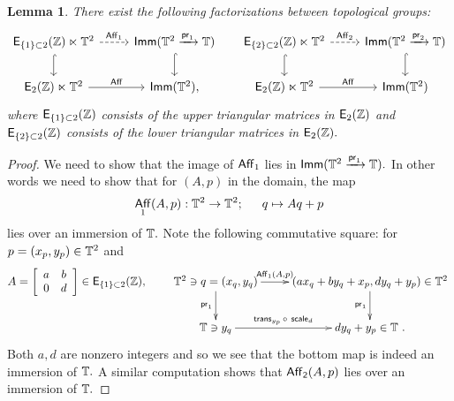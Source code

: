 \documentclass{amsart}
\newtheorem{lemma}[theorem]{Lemma}
\theoremstyle{definition}
\theoremstyle{remark}
\DeclareMathOperator{\pr}{\mathsf{pr}}
\newcommand{\xra}{\xrightarrow}
\DeclareMathOperator{\trans}{\sf trans}
\DeclareMathOperator{\Imm}{\sf Imm}
\DeclareMathOperator{\Aff}{\sf Aff}
\begin{document}
\begin{lemma} %
There exist the following factorizations between topological groups: %
\[
\begin{tikzcd}
{\sf E}_{\{1\} \subset 2}(\ZZ) \ltimes \TT^{2} \arrow[dashed, r, "{\sf Aff}_{1}"] \arrow[hookrightarrow]{d}& \Imm(\TT^2 \xra{\pr_1} \TT)  \arrow[hookrightarrow]{d} \\
{\sf E}_{2}(\ZZ) \ltimes \TT^{2} \arrow[r, "{\sf Aff}"] & \Imm(\TT^{2}),
\end{tikzcd}
\hspace{15pt}
\begin{tikzcd}
{\sf E}_{\{2\} \subset 2}(\ZZ) \ltimes \TT^{2} \arrow[dashed, r, "{\sf Aff}_{2}"] \arrow[hookrightarrow]{d}& \Imm(\TT^2 \xra{\pr_2} \TT)  \arrow[hookrightarrow]{d} \\
{\sf E}_{2}(\ZZ) \ltimes \TT^{2} \arrow[r, "{\sf Aff}"] & \Imm(\TT^{2})
\end{tikzcd}
\]
where ${\sf E}_{\{1\} \subset 2}(\mathbb Z)$ consists of the upper triangular matrices in ${\sf E}_{2}(\mathbb Z)$ and ${\sf E}_{\{2\} \subset 2}(\mathbb Z)$ consists of the lower triangular matrices in ${\sf E}_{2}(\mathbb Z).$ 
\end{lemma}
\begin{proof}
We need to show that the image of ${\sf Aff}_{1}$ lies in $\Imm(\TT^2 \xra{\pr_1} \TT).$ In other words we need to show that for $(A, p)$ in the domain, the map $$\Aff_{1}(A, p): \TT^{2} \rightarrow \TT^{2}; \hspace{15pt} q \mapsto Aq + p$$ lies over an immersion of $\mathbb T.$ Note the following commutative square:
for $p = (x_{p}, y_{p}) \in \mathbb T^{2}$ and
\[
A=
\left[ {\begin{array}{cc}
 a & b \\
 0 & d \\
\end{array} } \right] \in {\sf E}_{\{1\} \subset 2}(\ZZ), \hspace{ 20 pt}
\xymatrix{
\TT^{2} \ni q = (x_{q}, y_{q})
\ar[r]^-{\Aff_{1}(A, p)}
\ar[d]_-{\pr_{1}}
&
(ax_{q} + by_{q} + x_{p} , dy_{q} + y_{p}) \in \TT^{2} \ar[d]_-{\pr_{1}}
\\
\TT \ni y_{q}
\ar[r]^-{\trans_{y_{p}} \circ{~} {\sf scale}_{d}}
&
dy_{q} + y_{p} \in \TT
~.
}
\]
Both $a, d$ are nonzero integers and so we see that the bottom map is indeed an immersion of $\mathbb T.$ A similar computation shows that ${\sf \Aff_{2}}(A, p)$ lies over an immersion of $\mathbb T.$
\end{proof}
\end{document}
